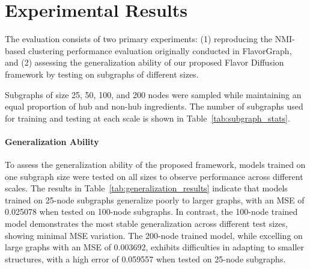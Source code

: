 \section{Experimental Results}

The evaluation consists of two primary experiments: (1) reproducing the NMI-based clustering performance evaluation originally conducted in FlavorGraph, and (2) assessing the generalization ability of our proposed Flavor Diffusion framework by testing on subgraphs of different sizes.

Subgraphs of size 25, 50, 100, and 200 nodes were sampled while maintaining an equal proportion of hub and non-hub ingredients. The number of subgraphs used for training and testing at each scale is shown in Table~\ref{tab:subgraph_stats}. 

\begin{table}[h!]
  \centering
  \caption{Subgraph Composition for Training and Testing}
  \label{tab:subgraph_stats}
\end{table}

\paragraph{Generalization Ability}

To assess the generalization ability of the proposed framework, models trained on one subgraph size were tested on all sizes to observe performance across different scales. The results in Table~\ref{tab:generalization_results} indicate that models trained on 25-node subgraphs generalize poorly to larger graphs, with an MSE of 0.025078 when tested on 100-node subgraphs. In contrast, the 100-node trained model demonstrates the most stable generalization across different test sizes, showing minimal MSE variation. The 200-node trained model, while excelling on large graphs with an MSE of 0.003692, exhibits difficulties in adapting to smaller structures, with a high error of 0.059557 when tested on 25-node subgraphs.

